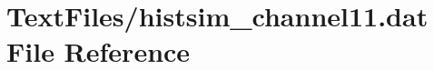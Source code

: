 \hypertarget{TextFiles_2histsim__channel11_8dat}{}\section{Text\+Files/histsim\+\_\+channel11.dat File Reference}
\label{TextFiles_2histsim__channel11_8dat}
